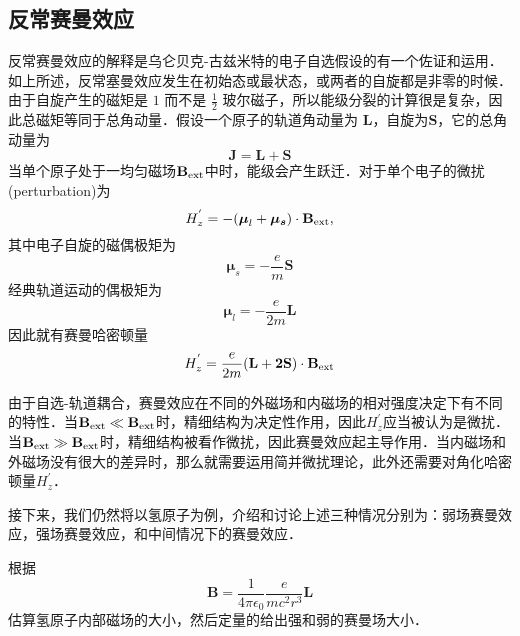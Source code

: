 \subsection{反常赛曼效应}
反常赛曼效应的解释是乌仑贝克-古兹米特的电子自选假设的有一个佐证和运用．如上所述，反常塞曼效应发生在初始态或最状态，或两者的自旋都是非零的时候．由于自旋产生的磁矩是 $1$ 而不是 $\frac{1}{2}$ 玻尔磁子，所以能级分裂的计算很是复杂，因此总磁矩等同于总角动量．假设一个原子的轨道角动量为 $\mathbf{L}$，自旋为$\mathbf{S}$，它的总角动量为
$$\mathbf{J=L+S}$$
当单个原子处于一均匀磁场$\mathbf{B}_{\rm{ext}}$中时，能级会产生跃迁．对于单个电子的微扰(perturbation)为
$$H_z^{'} = -(\boldsymbol{\mu}_l+\boldsymbol{\mu_s})\cdot \mathbf{B}_{\rm{ext}},$$
其中电子自旋的磁偶极矩为$$\boldsymbol\mu _s =-\frac{e}{m}\mathbf{S}$$经典轨道运动的偶极矩为
$$\boldsymbol\mu _l =-\frac{e}{2m}\mathbf{L}$$
因此就有赛曼哈密顿量
\begin{equation}\label{ZemEff_eq5}
H_z^{'} = \frac{e}{2m}(\mathbf{L+2S})\cdot \mathbf{B}_{\rm{ext}}
\end{equation}

由于自选-轨道耦合，赛曼效应在不同的外磁场和内磁场的相对强度决定下有不同的特性．当$\mathbf{B}_{\rm{ext}}\ll \mathbf{B}_{\rm{ext}}$时，精细结构为决定性作用，因此$H_z^{'}$应当被认为是微扰．当$\mathbf{B}_{\rm{ext}}\gg \mathbf{B}_{\rm{ext}}$时，精细结构被看作微扰，因此赛曼效应起主导作用．当内磁场和外磁场没有很大的差异时，那么就需要运用简并微扰理论，此外还需要对角化哈密顿量$H_z^{'}$．

接下来，我们仍然将以氢原子为例，介绍和讨论上述三种情况分别为：弱场赛曼效应，强场赛曼效应，和中间情况下的赛曼效应．
\begin{exercise}{}
根据
\begin{equation}
\mathbf{B}=\frac{1}{4\pi\epsilon_0}\frac{e}{mc^2r^3}\mathbf{L}
\end{equation}
估算氢原子内部磁场的大小，然后定量的给出强和弱的赛曼场大小．
\end{exercise}
